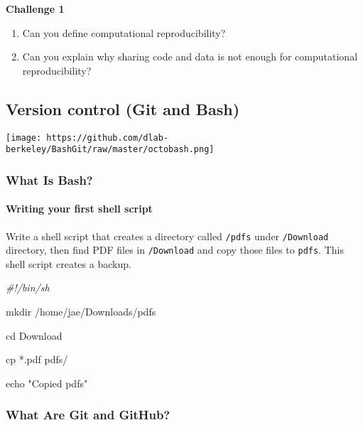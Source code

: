 \documentclass[
]{book}
\newenvironment{Shaded}{\begin{snugshade}}{\end{snugshade}}
\newcommand{\BuiltInTok}[1]{#1}
\newcommand{\CommentTok}[1]{\textcolor[rgb]{0.56,0.35,0.01}{\textit{#1}}}
\newcommand{\FunctionTok}[1]{\textcolor[rgb]{0.00,0.00,0.00}{#1}}
\newcommand{\NormalTok}[1]{#1}
\newcommand{\StringTok}[1]{\textcolor[rgb]{0.31,0.60,0.02}{#1}}
\providecommand{\tightlist}{%
  \setlength{\itemsep}{0pt}\setlength{\parskip}{0pt}}
\begin{document}
\textbf{Challenge 1}

\begin{enumerate}
\def\labelenumi{\arabic{enumi}.}
\tightlist
\item
  Can you define computational reproducibility?
\item
  Can you explain why sharing code and data is not enough for computational reproducibility?
\end{enumerate}

\hypertarget{version-control-git-and-bash}{%
\subsection{Version control (Git and Bash)}\label{version-control-git-and-bash}}

\texttt{[image: https://github.com/dlab-berkeley/BashGit/raw/master/octobash.png]}

\hypertarget{what-is-bash}{%
\subsubsection{What Is Bash?}\label{what-is-bash}}

\hypertarget{writing-your-first-shell-script}{%
\paragraph{Writing your first shell script}\label{writing-your-first-shell-script}}

Write a shell script that creates a directory called \texttt{/pdfs} under \texttt{/Download} directory, then find PDF files in \texttt{/Download} and copy those files to \texttt{pdfs}. This shell script creates a backup.

\begin{Shaded}
\begin{Highlighting}[]

\CommentTok{\#!/bin/sh}

\FunctionTok{mkdir}\NormalTok{ /home/jae/Downloads/pdfs }

\BuiltInTok{cd}\NormalTok{ Download}

\FunctionTok{cp}\NormalTok{ *.pdf pdfs/ }

\BuiltInTok{echo} \StringTok{"Copied pdfs"}
\end{Highlighting}
\end{Shaded}

\hypertarget{what-are-git-and-github}{%
\subsubsection{What Are Git and GitHub?}\label{what-are-git-and-github}}
\end{document}

